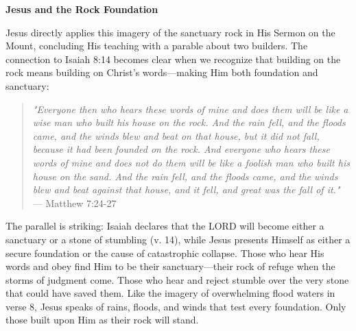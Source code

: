 \documentclass[11pt]{article}
\begin{document}
\vspace{3em}
{\large\bfseries Jesus and the Rock Foundation}
\vspace{1em}

Jesus directly applies this imagery of the sanctuary rock in His Sermon on the Mount, concluding His teaching with a parable about two builders. The connection to Isaiah 8:14 becomes clear when we recognize that building on the rock means building on Christ's words—making Him both foundation and sanctuary:

\begin{quote}
\textit{"Everyone then who hears these words of mine and does them will be like a wise man who built his house on the rock. And the rain fell, and the floods came, and the winds blew and beat on that house, but it did not fall, because it had been founded on the rock. And everyone who hears these words of mine and does not do them will be like a foolish man who built his house on the sand. And the rain fell, and the floods came, and the winds blew and beat against that house, and it fell, and great was the fall of it."}\\
\hfill --- Matthew 7:24-27
\end{quote}

\vspace{1em}
The parallel is striking: Isaiah declares that the LORD will become either a sanctuary or a stone of stumbling (v. 14), while Jesus presents Himself as either a secure foundation or the cause of catastrophic collapse. Those who hear His words and obey find Him to be their sanctuary—their rock of refuge when the storms of judgment come. Those who hear and reject stumble over the very stone that could have saved them. Like the imagery of overwhelming flood waters in verse 8, Jesus speaks of rains, floods, and winds that test every foundation. Only those built upon Him as their rock will stand.
\end{document}
